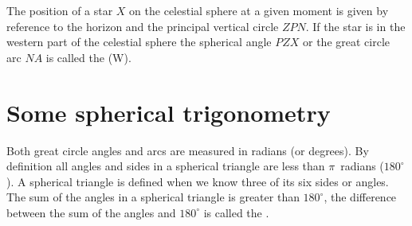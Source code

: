 The position of a star $X$ on the celestial sphere at a given moment
is given by reference to the horizon and the principal vertical circle
$ZPN$. If the star is in the western part of the celestial sphere the
spherical angle $PZX$ or the great circle arc $NA$ is called the
{} (W). 

\section{Some spherical trigonometry}

Both great circle angles and arcs are measured in radians (or
degrees). By definition all angles and sides in a spherical
triangle are less than $\pi$~radians ($180^\circ$). A spherical
triangle is defined when we know three of its six sides or angles. The
sum of the angles in a spherical triangle is greater than
$180^\circ$, the difference between the sum of the angles and
$180^\circ$ is called the {}.

